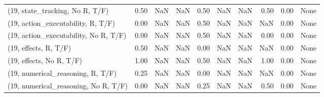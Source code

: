 \begin{table*}[h!]
\begin{adjustbox}{width=2\columnwidth,center}
\begin{tabular}{lrrr|rrr|rrr}
(19, state\_tracking, No R, T/F)       &                      0.50 &                   NaN &                       NaN &                          0.50 &                       NaN &                           NaN &                                   0.50 &                               0.00 &                                  None \\
(19, action\_executability, R, T/F)    &                      0.00 &                   NaN &                       NaN &                          0.50 &                       NaN &                           NaN &                                    NaN &                               0.00 &                                  None \\
(19, action\_executability, No R, T/F) &                      0.00 &                   NaN &                       NaN &                          0.50 &                       NaN &                           NaN &                                   0.00 &                               0.00 &                                  None \\
(19, effects, R, T/F)                 &                      0.50 &                   NaN &                       NaN &                          0.00 &                       NaN &                           NaN &                                    NaN &                               0.00 &                                  None \\
(19, effects, No R, T/F)              &                      1.00 &                   NaN &                       NaN &                          0.50 &                       NaN &                           NaN &                                   1.00 &                               0.00 &                                  None \\
(19, numerical\_reasoning, R, T/F)     &                      0.25 &                   NaN &                       NaN &                          0.00 &                       NaN &                           NaN &                                    NaN &                               0.00 &                                  None \\
(19, numerical\_reasoning, No R, T/F)  &                      0.00 &                   NaN &                       NaN &                          0.25 &                       NaN &                           NaN &                                   0.50 &                               0.00 &                                  None \\

\end{tabular}
\end{adjustbox}
\end{table*}
